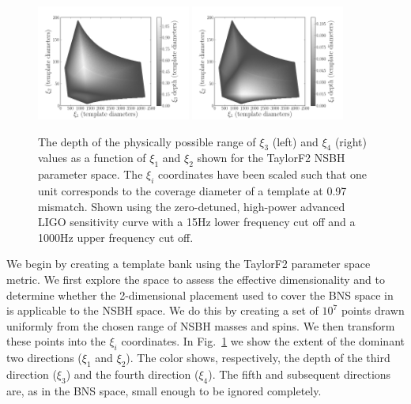\begin{figure}
    \centering
    \begin{minipage}[l]{2.0\columnwidth}
    \centering
\includegraphics[width=0.45\textwidth]
{papers/nsbh_effectualness/figure1A.png}
\includegraphics[width=0.45\textwidth]
{papers/nsbh_effectualness/figure1B.png}
\caption{\label{fig:bankF2depths}
The depth of the physically possible range of $\xi_3$ (left) and $\xi_4$ (right)
values as a function of
$\xi_1$ and $\xi_2$ shown for the TaylorF2 \ac{NSBH} parameter space.
The $\xi_i$ coordinates have been scaled
such that one unit corresponds to the coverage diameter of a template
at 0.97 mismatch. Shown using the zero-detuned, high-power advanced LIGO
sensitivity curve with a 15Hz lower frequency cut off
and a 1000Hz upper frequency cut off.}
\end{minipage}
\end{figure}

We begin by creating a template bank using the TaylorF2 parameter space metric.
We first explore the space to assess the effective dimensionality and to
determine whether the 2-dimensional placement used to cover the \ac{BNS}
space in~\cite{Brown:2012qf} is applicable to the \ac{NSBH}
space. We do this by creating a set of $10^7$ points drawn uniformly from the
chosen range of \ac{NSBH} masses and spins. We then transform these points
into the $\xi_i$ coordinates. In Fig.~\ref{fig:bankF2depths} we show the
extent of the dominant two directions ($\xi_1$ and $\xi_2$). The color shows,
respectively, the depth of the third direction ($\xi_3$) and the fourth
direction ($\xi_4$). The fifth and subsequent directions are, as in the \ac{BNS}
space, small enough to be ignored completely.

